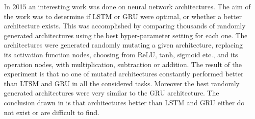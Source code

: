 In 2015 an interesting work\cite{architectureMutations} was done  on neural network architectures. The aim of the work was to determine if LSTM or GRU were optimal, or whether a better architecture exists. This was accomplished by comparing thousands of randomly generated architectures using the best hyper-parameter setting for each one. The architectures were generated randomly mutating a given architecture, replacing its activation function nodes, choosing from ReLU, tanh, sigmoid etc., and its operation nodes, with multiplication, subtraction or addition. The result of the experiment is that no one of mutated architectures constantly performed better than LTSM and GRU in all the considered tasks. Moreover the best randomly generated architectures were very similar to the GRU architecture. The conclusion drawn in \cite{architectureMutations}  is that architectures better than LSTM and GRU  either do not exist or are difficult to find. 